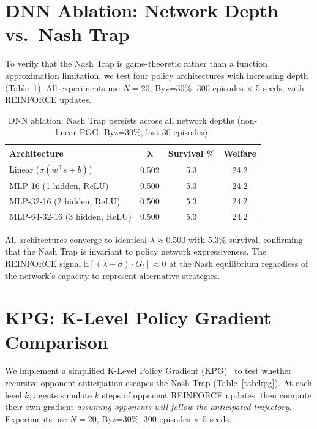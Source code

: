 \documentclass{article}
\begin{document}
\section{DNN Ablation: Network Depth vs.\ Nash Trap}
\label{app:dnn_ablation}

To verify that the Nash Trap is game-theoretic rather than a function approximation limitation, we test four policy architectures with increasing depth (Table~\ref{tab:dnn_ablation}).
All experiments use $N{=}20$, Byz=30\%, 300 episodes $\times$ 5 seeds, with REINFORCE updates.

\begin{table}[h]
\centering
\caption{DNN ablation: Nash Trap persists across all network depths (non-linear PGG, Byz=30\%, last 30 episodes).}
\label{tab:dnn_ablation}
\begin{tabular}{lccc}
\toprule
\textbf{Architecture} & $\boldsymbol{\bar{\lambda}}$ & \textbf{Survival \%} & \textbf{Welfare} \\
\midrule
Linear ($\sigma(w^\top s + b)$) & 0.502 & 5.3 & 24.2 \\
MLP-16 (1 hidden, ReLU) & 0.500 & 5.3 & 24.2 \\
MLP-32-16 (2 hidden, ReLU) & 0.500 & 5.3 & 24.2 \\
MLP-64-32-16 (3 hidden, ReLU) & 0.500 & 5.3 & 24.2 \\
\bottomrule
\end{tabular}
\end{table}

\noindent All architectures converge to identical $\lambda \approx 0.500$ with 5.3\% survival, confirming that the Nash Trap is invariant to policy network expressiveness.
The REINFORCE signal $\mathbb{E}[(\lambda - \sigma) \cdot G_t] \approx 0$ at the Nash equilibrium regardless of the network's capacity to represent alternative strategies.

\section{KPG: K-Level Policy Gradient Comparison}
\label{app:kpg}

We implement a simplified K-Level Policy Gradient (KPG)~\citep{somani2024kpg} to test whether recursive opponent anticipation escapes the Nash Trap (Table~\ref{tab:kpg}).
At each level $k$, agents simulate $k$ steps of opponent REINFORCE updates, then compute their own gradient \emph{assuming opponents will follow the anticipated trajectory}.
Experiments use $N{=}20$, Byz=30\%, 300 episodes $\times$ 5 seeds.
\end{document}
